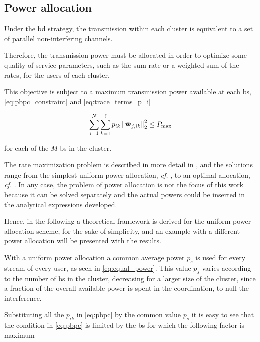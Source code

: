 \subsection{Power allocation}\label{ssec:achiev_rate_power}

Under the \gls{bd} strategy, the transmission within each cluster is equivalent
to a set of parallel non-interfering channels.

Therefore, the transmission power must be allocated in order to optimize some
quality of service parameters, such as the sum rate or a weighted sum of the
rates, for the users of each cluster.

This objective is subject to a maximum transmission power available at each
\gls{bs}, \eqref{eq:pbpc_constraint} and \eqref{eq:trace_terms_p_i}

\begin{equation} \label{eq:pbpc}
	\sum\limits_{i = 1}^N \sum\limits_{k = 1}^\ell p_{ik} \left\| \mathbf{\bar{w}}_{j, ik}
    \right\|_2^2 \leq P_{\max}
\end{equation}

\noindent
for each of the $M$ \gls{bs} in the cluster.

The rate maximization problem is described in more detail in
, and the solutions range from the simplest uniform
power allocation, \emph{cf.} , to an optimal
allocation, \emph{cf.} . In any case, the
problem of power allocation is not the focus of this work because it can be
solved separately and the actual powers could be inserted in the analytical
expressions developed.

Hence, in the following a theoretical framework is derived for the uniform power
allocation scheme, for the sake of simplicity, and an example with a different
power allocation will be presented with the results.

With a uniform power allocation a common average power $p_s$ is used for every
stream of every user, as seen in \eqref{eq:equal_power}. This value $p_s$ varies
according to the number of \gls{bs} in the cluster, decreasing for a larger size
of the cluster, since a fraction of the overall available power is spent in the
coordination, to null the interference.

Substituting all the $p_{ik}$ in \eqref{eq:pbpc} by the common value $p_s$ it is
easy to see that the condition in \eqref{eq:pbpc} is limited by the \gls{bs} for
which the following factor is maximum

